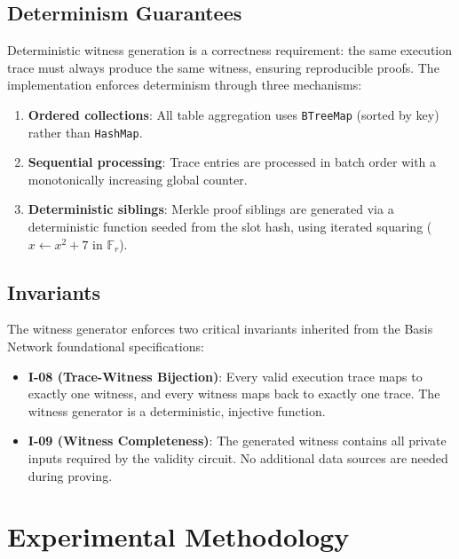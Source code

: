 \documentclass[conference]{IEEEtran}
\newcommand{\Fr}{\mathbb{F}_r}
\begin{document}
\subsection{Determinism Guarantees}

Deterministic witness generation is a correctness requirement: the same
execution trace must always produce the same witness, ensuring
reproducible proofs. The implementation enforces determinism through
three mechanisms:

\begin{enumerate}
\item \textbf{Ordered collections}: All table aggregation uses
      \texttt{BTreeMap} (sorted by key) rather than \texttt{HashMap}.
\item \textbf{Sequential processing}: Trace entries are processed in
      batch order with a monotonically increasing global counter.
\item \textbf{Deterministic siblings}: Merkle proof siblings are
      generated via a deterministic function seeded from the slot hash,
      using iterated squaring ($x \leftarrow x^2 + 7$ in $\Fr$).
\end{enumerate}

\subsection{Invariants}
\label{sec:invariants}

The witness generator enforces two critical invariants inherited from
the Basis Network foundational specifications:

\begin{itemize}
\item \textbf{I-08 (Trace-Witness Bijection)}: Every valid execution
      trace maps to exactly one witness, and every witness maps back to
      exactly one trace. The witness generator is a deterministic,
      injective function.
\item \textbf{I-09 (Witness Completeness)}: The generated witness
      contains all private inputs required by the validity circuit. No
      additional data sources are needed during proving.
\end{itemize}

\section{Experimental Methodology}
\label{sec:methodology}
\end{document}
